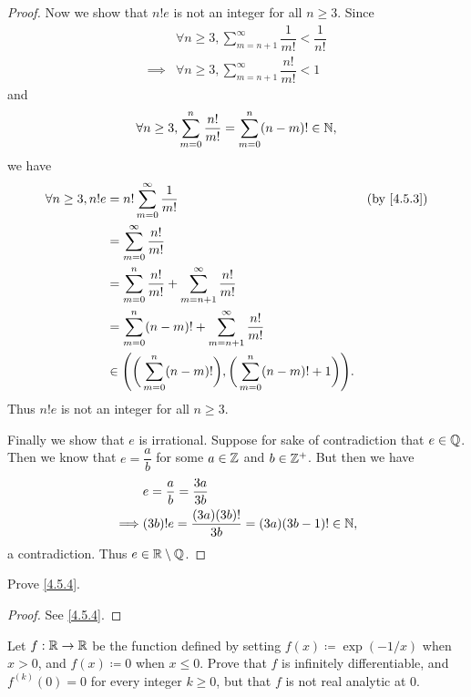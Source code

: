 \begin{proof}
  Now we show that \(n! e\) is not an integer for all \(n \geq 3\).
  Since
  \begin{align*}
             & \forall n \geq 3, \sum_{m = n + 1}^\infty \dfrac{1}{m!} < \dfrac{1}{n!} \\
    \implies & \forall n \geq 3, \sum_{m = n + 1}^\infty \dfrac{n!}{m!} < 1
  \end{align*}
  and
  \[
    \forall n \geq 3, \sum_{m = 0}^n \dfrac{n!}{m!} = \sum_{m = 0}^n (n - m)! \in \mathbb{N},
  \]
  we have
  \begin{align*}
    \forall n \geq 3, n! e & = n! \sum_{m = 0}^\infty \dfrac{1}{m!}                                                        &  & \by{4.5.3} \\
                           & = \sum_{m = 0}^\infty \dfrac{n!}{m!}                                                                          \\
                           & = \sum_{m = 0}^n \dfrac{n!}{m!} + \sum_{m = n + 1}^\infty \dfrac{n!}{m!}                                      \\
                           & = \sum_{m = 0}^n (n - m)! + \sum_{m = n + 1}^\infty \dfrac{n!}{m!}                                            \\
                           & \in \Bigg(\bigg(\sum_{m = 0}^n (n - m)!\bigg), \bigg(\sum_{m = 0}^n (n - m)! + 1\bigg)\Bigg).
  \end{align*}
  Thus \(n! e\) is not an integer for all \(n \geq 3\).

  Finally we show that \(e\) is irrational.
  Suppose for sake of contradiction that \(e \in \mathbb{Q}\).
  Then we know that \(e = \dfrac{a}{b}\) for some \(a \in \mathbb{Z}\) and \(b \in \mathbb{Z}^+\).
  But then we have
  \begin{align*}
             & e = \dfrac{a}{b} = \dfrac{3a}{3b}                         \\
    \implies & (3b)! e = \dfrac{(3a) (3b)!}{3b} = (3a) (3b - 1)! \in \mathbb{N},
  \end{align*}
  a contradiction.
  Thus \(e \in \mathbb{R} \setminus \mathbb{Q}\).
\end{proof}

\begin{ex}\label{ex:4.5.3}
  Prove \cref{4.5.4}.
\end{ex}

\begin{proof}
  See \cref{4.5.4}.
\end{proof}

\begin{ex}\label{ex:4.5.4}
  Let \(f : \mathbb{R} \to \mathbb{R}\) be the function defined by setting \(f(x) \coloneqq \exp(-1 / x)\) when \(x > 0\), and \(f(x) \coloneqq 0\) when \(x \leq 0\).
  Prove that \(f\) is infinitely differentiable, and \(f^{(k)}(0) = 0\) for every integer \(k \geq 0\), but that \(f\) is not real analytic at \(0\).
\end{ex}

